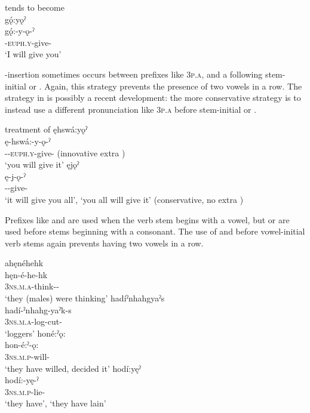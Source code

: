 \ea\label{ex:wdsoundchangex9}  tends to become \\
gǫ́:yǫˀ\\
\gll gǫ́:-y-ǫ-ˀ\\
 -\textsc{euph.y}-give-{\punctual}\\
\glt `I will give you'
\z


-insertion sometimes occurs between prefixes like  \textsc{3p.a}, and a following stem-initial  or  . Again, this strategy prevents the presence of two vowels in a row. The strategy in  is possibly a recent development: the more conservative strategy is to instead use a different pronunciation like  \textsc{3p.a} before stem-initial  or  .

\ea\label{ex:wdsoundchangex10} treatment of 
\ea ęhswá:yǫˀ\\\label{ex:wdsoundchangex10a}
\gll ę-hswá:-y-ǫ-ˀ\\
 \fut--\textsc{euph.y}-give-{\punctual}  (innovative extra )\\
\glt `you will give it'
\ex ęjǫˀ\\\label{ex:wdsoundchangex10b}
\gll ę-j-ǫ-ˀ\\
\fut--give-{\punctual}\\
\glt ‘it will give you all’, ‘you all will give it’ (conservative, no extra )
\z
\z

Prefixes like   and   are used when the verb stem begins with a vowel, but   or   are used before stems beginning with a consonant. The use of  and  before vowel-initial verb stems again prevents having two vowels in a row.

\ea\label{ex:wdsoundchangex11}
\ea ahęnéhehk\\\label{ex:wdsoundchangex11a}
\gll hęn-é-he-hk\\
 \textsc{3ns.m.a}-think-{\habitual}-{\former} \\
\glt `they (males) were thinking'
\ex hadíˀnhahgyaˀs\\\label{ex:wdsoundchangex11b}
\gll hadí-ˀnhahg-yaˀk-s\\
 \textsc{3ns.m.a}-log-cut-{\habitual}\\
\glt `loggers'
\ex honé:ˀǫ:\\\label{ex:wdsoundchangex11c}
\gll hon-é:ˀ-ǫ:\\
 \textsc{3ns.m.p}-will-{\stative}\\
\glt `they have willed, decided it'
\ex hodí:yęˀ \\\label{ex:wdsoundchangex11d}
\gll hodí:-yę-ˀ\\
 \textsc{3ns.m.p}-lie-{\stative}\\
\glt ‘they have’, `they have lain'
\z
\z


